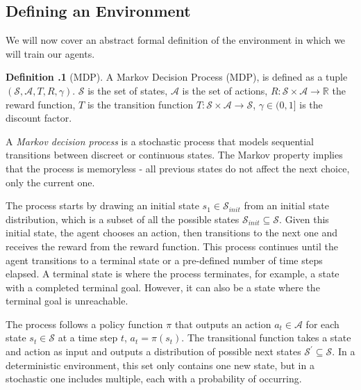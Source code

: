 \documentclass[12pt,A4]{report}
\theoremstyle{definition}
\newtheorem{definition}{Definition}[section]
\begin{document}

\subsection{Defining an Environment}
We will now cover an abstract formal definition of the environment in which we will train our agents.


\begin{displayquote}
  \textbf{Definition \thesection.1} (MDP).
  A Markov Decision Process (MDP), is defined as a tuple $(\mathcal{S}, \mathcal{A}, T, R, \gamma)$. $\mathcal{S}$ is the set of states, $\mathcal{A}$ is the set of actions, $R: \mathcal{S} \times \mathcal{A} \rightarrow \mathbb{R}$ the reward function, $T$ is the transition function $T: \mathcal{S} \times \mathcal{A} \rightarrow \mathcal{S}$, $\gamma \in (0, 1]$ is the discount factor.
\end{displayquote}

A \textit{Markov decision process} is a stochastic process that models sequential transitions between discreet or continuous states. The Markov property implies that the process is memoryless - all previous states do not affect the next choice, only the current one. 

The process starts by drawing an initial state $s_1 \in \mathcal{S}_{init}$ from an initial state distribution, which is a subset of all the possible states $\mathcal{S}_{init} \subseteq \mathcal{S}$. Given this initial state, the agent chooses an action, then transitions to the next one and receives the reward from the reward function. This process continues until the agent transitions to a terminal state or a pre-defined number of time steps elapsed. A terminal state is where the process terminates, for example, a state with a completed terminal goal. However, it can also be a state where the terminal goal is unreachable.

The process follows a policy function $\pi$ that outputs an action $a_t \in \mathcal{A}$ for each state $s_t \in \mathcal{S}$ at a time step $t$, $a_t = \pi(s_t)$. The transitional function takes a state and action as input and outputs a distribution of possible next states $\mathcal{S}^\prime \subseteq \mathcal{S}$. In a deterministic environment, this set only contains one new state, but in a stochastic one includes multiple, each with a probability of occurring.
\end{document}
